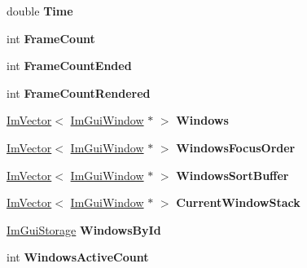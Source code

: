 \begin{DoxyCompactItemize}
\mbox{\label{structImGuiContext_a2b4eb26da74e5b80bdc7efa34d267570}} 
double {\bfseries Time}
\item 
\mbox{\label{structImGuiContext_ab9a1f3b3f15f0a6c5f29aef85f1a8ea2}} 
int {\bfseries Frame\+Count}
\item 
\mbox{\label{structImGuiContext_aa4cc3099c789be981d665c617b6d78a9}} 
int {\bfseries Frame\+Count\+Ended}
\item 
\mbox{\label{structImGuiContext_a64a96ecd43f4b10c1fec8eb3fc9bff89}} 
int {\bfseries Frame\+Count\+Rendered}
\item 
\mbox{\label{structImGuiContext_a0f59a9a861d097be066c6cc106e40f3e}} 
\hyperlink{structImVector}{Im\+Vector}$<$ \hyperlink{structImGuiWindow}{Im\+Gui\+Window} $\ast$ $>$ {\bfseries Windows}
\item 
\mbox{\label{structImGuiContext_a1fd9e62737932c069dce5f137a4a4fab}} 
\hyperlink{structImVector}{Im\+Vector}$<$ \hyperlink{structImGuiWindow}{Im\+Gui\+Window} $\ast$ $>$ {\bfseries Windows\+Focus\+Order}
\item 
\mbox{\label{structImGuiContext_af33de778de28b057fa7a42e4cbe0017a}} 
\hyperlink{structImVector}{Im\+Vector}$<$ \hyperlink{structImGuiWindow}{Im\+Gui\+Window} $\ast$ $>$ {\bfseries Windows\+Sort\+Buffer}
\item 
\mbox{\label{structImGuiContext_a19020a20e7bca2fadbb287106b92891b}} 
\hyperlink{structImVector}{Im\+Vector}$<$ \hyperlink{structImGuiWindow}{Im\+Gui\+Window} $\ast$ $>$ {\bfseries Current\+Window\+Stack}
\item 
\mbox{\label{structImGuiContext_adc1e46e1c1582a0f0eb74d957efedf98}} 
\hyperlink{structImGuiStorage}{Im\+Gui\+Storage} {\bfseries Windows\+By\+Id}
\item 
\mbox{\label{structImGuiContext_a95237c5f9eb869da0f1947c54a521489}} 
int {\bfseries Windows\+Active\+Count}
\item 
\mbox{\label{structImGuiContext_aa923044f396241668aef5ed2f4c4d847}} 

\end{DoxyCompactItemize}
